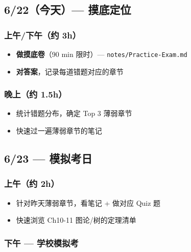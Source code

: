 \documentclass[10pt,a4paper,openany]{ctexbook}
\theoremstyle{definition}
\theoremstyle{remark}
\begin{document}
\vspace{-2pt}

\subsection{6/22（今天）— 摸底定位}

\subsubsection{上午/下午（约 3h）}

\begin{itemize}
\item [ ] \textbf{做摸底卷}（90 min 限时）— \texttt{notes/Practice-Exam.md}
\item [ ] \textbf{对答案}，记录每道错题对应的章节

\end{itemize}

\subsubsection{晚上（约 1.5h）}

\begin{itemize}
\item [ ] 统计错题分布，确定 Top 3 薄弱章节
\item [ ] 快速过一遍薄弱章节的笔记

\end{itemize}

\vspace{-2pt}

\subsection{6/23 — 模拟考日}

\subsubsection{上午（约 2h）}

\begin{itemize}
\item [ ] 针对昨天薄弱章节，看笔记 + 做对应 Quiz 题
\item [ ] 快速浏览 Ch10-11 图论/树的定理清单

\end{itemize}

\subsubsection{下午 — 学校模拟考}
\end{document}
